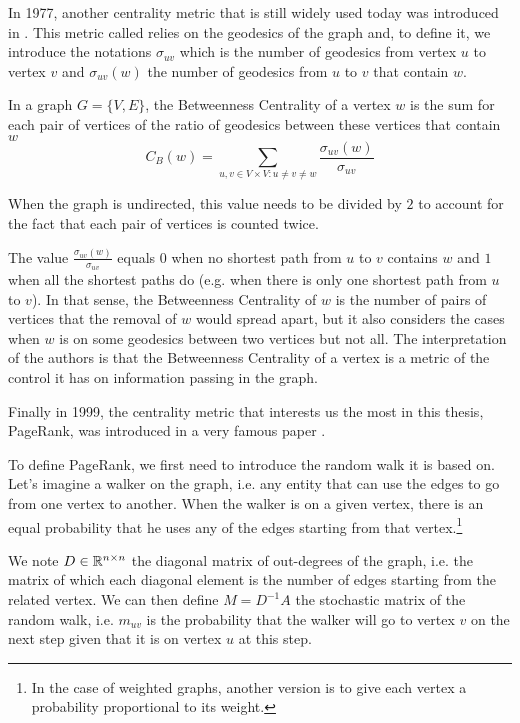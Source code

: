 In 1977, another centrality metric that is still widely used today was introduced in \cite{freeman1977_BetweennessCentrality}. This metric called  relies on the geodesics of the graph and, to define it, we introduce the notations $\sigma_{uv}$ which is the number of geodesics from vertex $u$ to vertex $v$ and $\sigma_{uv}(w)$ the number of geodesics from $u$ to $v$ that contain $w$.

\begin{definition}
    In a graph $G = \{V, E\}$, the Betweenness Centrality of a vertex $w$ is the sum for each pair of vertices of the ratio of geodesics between these vertices that contain $w$
    \begin{equation}
        C_B(w) = \sum_{u,v \in V\times V : u\neq v \neq w} \frac{\sigma_{uv}(w)}{\sigma_{uv}}
    \end{equation}
\end{definition}

When the graph is undirected, this value needs to be divided by $2$ to account for the fact that each pair of vertices is counted twice.

The value $\frac{\sigma_{uv}(w)}{\sigma_{uv}}$ equals $0$ when no shortest path from $u$ to $v$ contains $w$ and $1$ when all the shortest paths do (e.g. when there is only one shortest path from $u$ to $v$). In that sense, the Betweenness Centrality of $w$ is the number of pairs of vertices that the removal of $w$ would spread apart, but it also considers the cases when $w$ is on some geodesics between two vertices but not all. The interpretation of the authors is that the Betweenness Centrality of a vertex is a metric of the control it has on information passing in the graph.

Finally in 1999, the centrality metric that interests us the most in this thesis, PageRank, was introduced in a very famous paper \cite{pagerank}.

To define PageRank, we first need to introduce the random walk it is based on. Let's imagine a walker on the graph, i.e. any entity that can use the edges to go from one vertex to another. When the walker is on a given vertex, there is an equal probability that he uses any of the edges starting from that vertex.\footnote{In the case of weighted graphs, another version is to give each vertex a probability proportional to its weight.}

We note $D \in \mathbb{R}^{n\times n}$ the diagonal matrix of out-degrees of the graph, i.e. the matrix of which each diagonal element is the number of edges starting from the related vertex. We can then define $M = D^{-1} A$ the stochastic matrix of the random walk, i.e. $m_{uv}$ is the probability that the walker will go to vertex $v$ on the next step given that it is on vertex $u$ at this step.

